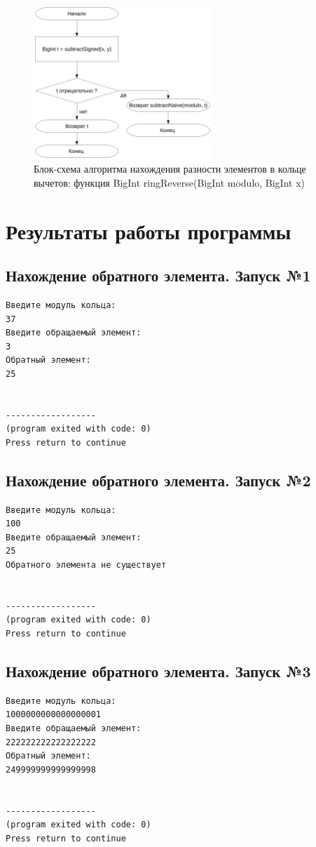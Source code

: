\documentclass[a4paper,12pt]{article} %
\begin{document}
\begin{figure}[ht]
	\centering
	\includegraphics[width=0.6\textwidth]{lr5_subtractRing.pdf}
	\caption{
		Блок-схема алгоритма нахождения разности элементов в кольце вычетов:
		функция BigInt ringReverse(BigInt modulo, BigInt x)
	}
\end{figure}

\clearpage

\section*{Результаты работы программы}

\subsection*{Нахождение обратного элемента. Запуск №1}
\begin{verbatim}
Введите модуль кольца:
37
Введите обращаемый элемент:
3
Обратный элемент:
25


------------------
(program exited with code: 0)
Press return to continue
\end{verbatim}

\subsection*{Нахождение обратного элемента. Запуск №2}
\begin{verbatim}
Введите модуль кольца:
100
Введите обращаемый элемент:
25
Обратного элемента не существует


------------------
(program exited with code: 0)
Press return to continue
\end{verbatim}

\subsection*{Нахождение обратного элемента. Запуск №3}
\begin{verbatim}
Введите модуль кольца:
1000000000000000001
Введите обращаемый элемент:
222222222222222222
Обратный элемент:
249999999999999998


------------------
(program exited with code: 0)
Press return to continue
\end{verbatim}
\end{document}
